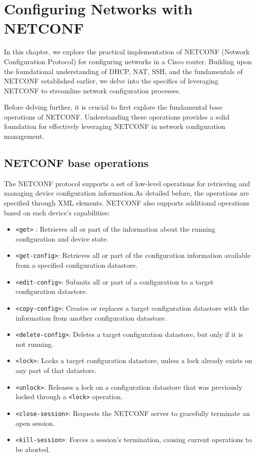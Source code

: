 \chapter{Configuring Networks with NETCONF}

In this chapter, we explore the practical implementation of NETCONF (Network Configuration Protocol) for configuring networks in a Cisco router. Building upon the foundational understanding of DHCP, NAT, SSH, and the fundamentals of NETCONF established earlier, we delve into the specifics of leveraging NETCONF to streamline network configuration processes.

Before delving further, it is crucial to first explore the fundamental base operations of NETCONF. Understanding these operations provides a solid foundation for effectively leveraging NETCONF in network configuration management.

\section{NETCONF base operations}

The NETCONF protocol supports a set of low-level operations for retrieving and managing device configuration information.As detailed before, the operations are specified through XML elements. NETCONF also supports additional operations based on each device's capabilities:

\begin{itemize}
    \item \texttt{<get>} : Retrieves all or part of the information about the running configuration and device state.
    \item \texttt{<get-config>}: Retrieves all or part of the configuration information available from a specified configuration datastore.
    \item \texttt{<edit-config>}: Submits all or part of a configuration to a target configuration datastore.
    \item \texttt{<copy-config>}: Creates or replaces a target configuration datastore with the information from another configuration datastore.
    \item \texttt{<delete-config>}: Deletes a target configuration datastore, but only if it is not running.
    \item \texttt{<lock>}: Locks a target configuration datastore, unless a lock already exists on any part of that datastore.
    \item \texttt{<unlock>}: Releases a lock on a configuration datastore that was previously locked through a \texttt{<lock>} operation.
    \item \texttt{<close-session>}: Requests the NETCONF server to gracefully terminate an open session.
    \item \texttt{<kill-session>}: Forces a session's termination, causing current operations to be aborted.
\end{itemize}


